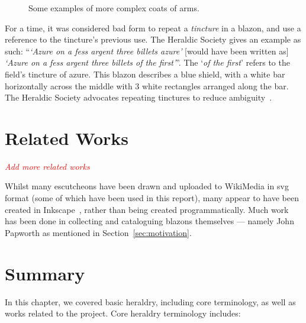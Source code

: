\documentclass[nobib, a4paper, twoside, justified]{tufte-book}
\makeatletter
\newcommand{\svg}{\gls{svg}\@\xspace}
\newcommand{\todo}[1]{{\noindent\textcolor{Red}{\textit{\quad#1}}\par}}
\makeatother
\begin{document}
\begin{figure*}[h]
  \qquad
  \caption{Some examples of more complex coats of arms.}\label{fig:complex_shields}
\end{figure*}

For a time, it was considered bad form to repeat a \textit{tincture} in a blazon, and use a
reference to the tincture's previous use. The Heraldic Society gives an example as such:
``\textit{`Azure on a fess argent three billets azure'} [would have been written as] \textit{`Azure
on a fess argent three billets of the first'}''. The `\textit{of the first}' refers to the field's
tincture of azure. This blazon describes a blue shield, with a white bar horizontally across the
middle with 3 white rectangles arranged along the bar. The Heraldic Society advocates repeating
tinctures to reduce ambiguity~\autocite{blazon_in_coa}.

\section{Related Works}%
\label{sec:related_works}

\todo{Add more related works}

Whilst many escutcheons have been drawn and uploaded to WikiMedia in
\svg~\autocite{ferraiolo2000scalable} format (some of which have been used in this report), many
appear to have been created in Inkscape~\autocite{inkscape}, rather than being created
programmatically. Much work has been done in collecting and cataloguing blazons themselves ---
namely John Papworth as mentioned in Section~\ref{sec:motivation}.

\section{Summary}%
\label{sec:background_summary}

In this chapter, we covered basic heraldry, including core terminology, as well as works related to
the project. Core heraldry terminology includes:
\end{document}
